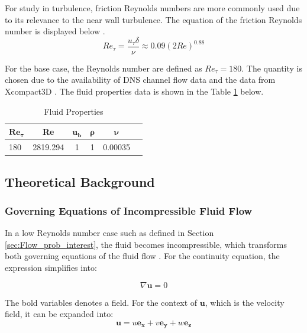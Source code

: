 For study in turbulence, friction Reynolds numbers are more commonly used due to its relevance to the near wall turbulence. The equation of the friction Reynolds number is displayed below \cite{Pope2000}.
\begin{equation}
	Re_\tau = \frac{u_\tau \delta}{\nu} \approx 0.09 (2Re)^{0.88} 
\end{equation}

For the base case, the Reynolds number are defined as $Re_\tau = 180$. The quantity is chosen due to the availability of DNS channel flow data \cite{Lee2015} and the data from Xcompact3D \cite{Bartholomew2020}. The fluid properties data is shown in the Table \ref{tab:fluprop} below.

\begin{table}[ht]
	\caption{Fluid Properties}
	\label{tab:fluprop}
	\centering
	\begin{tabular}{lccccc}
		\hline
		{$\boldsymbol{Re_\tau}$} & {Re} & {$\boldsymbol{u_b}$} & {$\boldsymbol{\rho}$} & {$\boldsymbol{\nu}$} \\ \hline
		180               & 2819.294    & 1          & 1               & 0.00035        \\ \hline
	\end{tabular}
\end{table}
 



\subsection{Theoretical Background}
\label{sec:Governing equations SECTION}




\subsubsection{Governing Equations of Incompressible Fluid Flow}
\label{sec:Governing equations comp}

In a low Reynolds number case such as defined in Section \ref{sec:Flow_prob_interest}, the fluid becomes incompressible, which transforms both governing equations of the fluid flow \cite{Konoszy2024}. For the continuity equation, the expression simplifies into:

\begin{equation}
	\nabla \mathbf{u} = 0
\end{equation}

The bold variables denotes a field. For the context of $\mathbf{u}$, which is the velocity field, it can be expanded into:
\begin{equation}
	\mathbf{u} = u \mathbf{e_x} + v \mathbf{e_y} + w \mathbf{e_z}
\end{equation}

